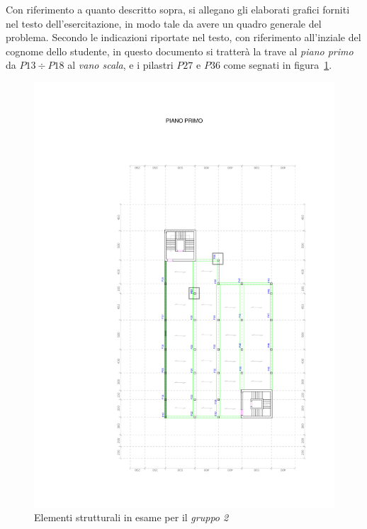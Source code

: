 Con riferimento a quanto descritto sopra, si allegano gli elaborati grafici forniti nel testo dell'esercitazione, in modo tale da avere un quadro generale del problema.
\cleardoublepage
\pagestyle{empty}{





}
\cleardoublepage
\pagestyle{plain}
Secondo le indicazioni riportate nel testo, con riferimento all'inziale del cognome dello studente, in questo documento si tratterà la trave al \emph{piano primo} da $P13 \div P18$ al \emph{vano scala}, e i pilastri $P27$ e $P36$ come segnati in figura~\ref{fig:pianoPrimo}.
\begin{figure}
 \centering
 \includegraphics[height=.6\textheight]{../../pianoPrimo_esercitazione.png}
 \caption{Elementi strutturali in esame per il \emph{gruppo 2}}
 \label{fig:pianoPrimo}
\end{figure}

